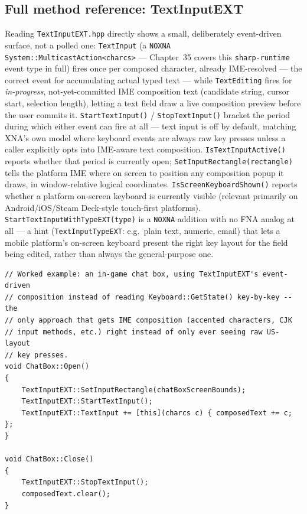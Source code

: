 \subsection{Full method reference: TextInputEXT}

Reading \texttt{TextInputEXT.hpp} directly shows a small, deliberately event-driven surface,
not a polled one: \texttt{TextInput} (a \texttt{NOXNA System::MulticastAction<charcs>} ---
Chapter~35 covers this \texttt{sharp-runtime} event type in full) fires once per composed
character, already IME-resolved --- the correct event for accumulating actual typed text ---
while \texttt{TextEditing} fires for \emph{in-progress}, not-yet-committed IME composition text
(candidate string, cursor start, selection length), letting a text field draw a live composition
preview before the user commits it. \texttt{StartTextInput()} / \texttt{StopTextInput()} bracket
the period during which either event can fire at all --- text input is off by default, matching
XNA's own model where keyboard events are always raw key presses unless a caller explicitly
opts into IME-aware text composition. \texttt{IsTextInputActive()} reports whether that period
is currently open; \texttt{SetInputRectangle(rectangle)} tells the platform IME where on screen
to position any composition popup it draws, in window-relative logical coordinates.
\texttt{IsScreenKeyboardShown()} reports whether a platform on-screen keyboard is currently
visible (relevant primarily on Android/iOS/Steam Deck-style touch-first platforms).
\texttt{StartTextInputWithTypeEXT(type)} is a \texttt{NOXNA} addition with no FNA analog at
all --- a hint (\texttt{TextInputTypeEXT}: e.g.\ plain text, numeric, email) that lets a mobile
platform's on-screen keyboard present the right key layout for the field being edited, rather
than always the general-purpose one.

\begin{lstlisting}
// Worked example: an in-game chat box, using TextInputEXT's event-driven
// composition instead of reading Keyboard::GetState() key-by-key -- the
// only approach that gets IME composition (accented characters, CJK
// input methods, etc.) right instead of only ever seeing raw US-layout
// key presses.
void ChatBox::Open()
{
    TextInputEXT::SetInputRectangle(chatBoxScreenBounds);
    TextInputEXT::StartTextInput();
    TextInputEXT::TextInput += [this](charcs c) { composedText += c; };
}

void ChatBox::Close()
{
    TextInputEXT::StopTextInput();
    composedText.clear();
}
\end{lstlisting}

